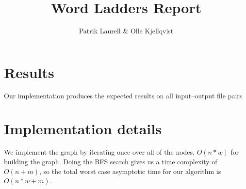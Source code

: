 \documentclass{tufte-handout}
\title{Word Ladders Report}
\author{Patrik Laurell \& Olle Kjellqvist}
\begin{document}
  \maketitle

  \section{Results}

  Our implementation produces the expected results on all input--output file pairs
  \section{Implementation details}

We implement the graph by iterating once over all of the nodes, $O(n*w)$ for building the graph. 
Doing the BFS search gives us a time complexity of $O(n + m)$, so the total worst case asymptotic time for our algorithm is $O(n*w + m)$.
\end{document}
